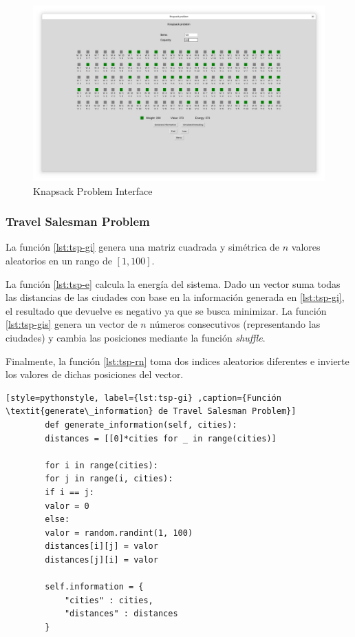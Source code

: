 \documentclass[12pt,twoside]{article}
\begin{document}
	\begin{figure}[h!]
		\centering
		\includegraphics[width=\linewidth]{img/kp}
		\caption{Knapsack Problem Interface}
		\label{fig:kp}
	\end{figure}
	
	
	\subsubsection{Travel Salesman Problem}
	
	La función \ref{lst:tsp-gi} genera una matriz cuadrada y simétrica de $n$ valores aleatorios en un rango de $[1, 100]$.
	
	La función \ref{lst:tsp-e} calcula la energía del sistema. Dado un vector suma todas las distancias de las ciudades con base en la información generada en \ref{lst:tsp-gi}, el resultado que devuelve es negativo ya que se busca minimizar. La función \ref{lst:tsp-gis} genera un vector de $n$ números consecutivos (representando las ciudades) y cambia las posiciones mediante la función \textit{shuffle}.
	
	Finalmente, la función \ref{lst:tsp-rn} toma dos indices aleatorios diferentes e invierte los valores de dichas posiciones del vector.
	
	\begin{lstlisting}[style=pythonstyle, label={lst:tsp-gi} ,caption={Función \textit{generate\_information} de Travel Salesman Problem}]
		def generate_information(self, cities):
		distances = [[0]*cities for _ in range(cities)]
		
		for i in range(cities):
		for j in range(i, cities):  
		if i == j:
		valor = 0  
		else:
		valor = random.randint(1, 100)
		distances[i][j] = valor
		distances[j][i] = valor 
		
		self.information = {
			"cities" : cities,
			"distances" : distances
		}
	\end{lstlisting}
	
\end{document}
